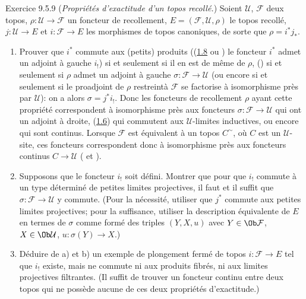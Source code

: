 \begin{enonce*}[remark]{Exercice 9.5.9}
(\emph{Propriétés d'exactitude d'un topos recollé.}) Soient
$\mathcal{U}$, $\mathcal{F}$ deux topos,
$\rho:\mathcal{U}\rightarrow \mathcal{F}$ un foncteur de
recollement, $E=(\mathcal{F}, \mathcal{U},\rho)$ le topos recollé,
$j:\mathcal{U}\rightarrow E$ et $i:\mathcal{F}\rightarrow E$ les
morphismes de topos canoniques, de sorte que
$\rho=i^{\ast}j_{\ast}$.
\begin{enumerate}
\renewcommand{\theenumi}{\alph{enumi}}
\renewcommand{\labelenumi}{\theenumi)}
\item Prouver que $i^{\ast}$ commute aux (petits) produits (\ie (\hyperref[IV.rem1.8]{1.8}
ou ) le foncteur $i^{\ast}$ admet un adjoint à gauche
$i_{!}$) si et seulement si il en est de même de $\rho$, \ie
(\loccit) si et seulement si $\rho$ admet un adjoint à gauche
$\sigma:\mathcal{F}\rightarrow \mathcal{U}$ (ou encore si et
seulement si le proadjoint de $\rho$ restreint\pageoriginale à
$\mathcal{F}$  se factorise à isomorphisme près par
$\mathcal{U}$): on a alors $\sigma=j^{\ast}i_{!}$. Donc les
foncteurs de recollement $\rho$ ayant cette propriété correspondent
à isomorphisme près aux foncteurs $\sigma:\mathcal{F}\rightarrow
\mathcal{U}$ qui ont un adjoint à droite, \ie (\hyperref[IV.cor1.6]{1.6}) qui
commutent aux $𝒰$-limites inductives, ou encore qui sont
continus. Lorsque $\mathcal{F}$ est équivalent à un topos
$C^{\sim}$, où $C$ est un $𝒰$-site, ces foncteurs
correspondent donc à isomorphisme près aux foncteurs continus
$C\rightarrow \mathcal{U}$ ( et ).

\item Supposons que le foncteur $i_{!}$ soit défini. Montrer que pour
que $i_{!}$ commute à un type déterminé de petites limites
projectives, il faut et il suffit que $\sigma:\mathcal{F}\rightarrow
\mathcal{U}$ y commute. (Pour la nécessité, utiliser que $j^{\ast}$
commute aux petites limites projectives; pour la suffisance,
utiliser la description équivalente de $E$ en termes de $\sigma$
comme formé des triples $(Y,X,u)$ avec $Y\in \Ob \mathcal{F}$, $X\in
\Ob \mathcal{U}$, $u:\sigma (Y)\rightarrow X$.)

\item Déduire de a) et b) un exemple de plongement fermé de topos
$i:\mathcal{F}\rightarrow E$ tel que $i_{!}$ existe, mais ne commute
ni aux produits fibrés, ni aux limites projectives filtrantes. (Il
suffit de trouver un foncteur continu entre deux topos qui ne
possède aucune de ces deux propriétés d'exactitude.)
\end{enumerate}
\end{enonce*}

